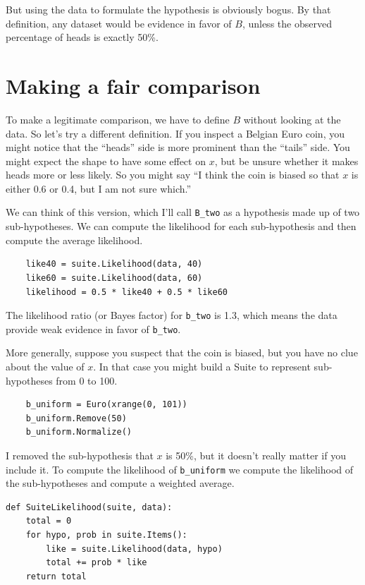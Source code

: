 \documentclass[12pt]{book}
\begin{document}
But using the data to formulate the hypothesis
is obviously bogus.  By that definition, any dataset would
be evidence in favor of $B$, unless the observed percentage of heads
is exactly 50\%.

\section{Making a fair comparison}

To make a legitimate comparison, we have to define $B$ without looking
at the data.  So let's try a different definition.  If you inspect
a Belgian Euro coin, you might notice that the ``heads'' side is more
prominent than the ``tails'' side.  You might expect the shape to 
have some effect on
$x$, but be unsure whether it makes heads more or less
likely.  So you might say ``I think the coin is biased so that
$x$ is either 0.6 or 0.4, but I am not sure which.''

We can think of this version, which I'll call \verb"B_two"
as a hypothesis made up of two
sub-hypotheses.  We can compute the likelihood for each
sub-hypothesis and then compute the average likelihood.

\begin{verbatim}
    like40 = suite.Likelihood(data, 40)
    like60 = suite.Likelihood(data, 60)
    likelihood = 0.5 * like40 + 0.5 * like60
\end{verbatim}

The likelihood ratio (or Bayes factor) for \verb"b_two" is 1.3, which
means the data provide weak evidence in favor of \verb"b_two".

More generally, suppose you suspect that the coin is biased,
but you have no clue about the value of $x$.  In that case you
might build a Suite to represent sub-hypotheses from 0 to 100.

\begin{verbatim}
    b_uniform = Euro(xrange(0, 101))
    b_uniform.Remove(50)
    b_uniform.Normalize()
\end{verbatim}

I removed the sub-hypothesis that $x$ is 50\%, but it doesn't
really matter if you include it.  To compute the likelihood of
\verb"b_uniform" we compute the likelihood of the sub-hypotheses
and compute a weighted average.

\begin{verbatim}
def SuiteLikelihood(suite, data):
    total = 0
    for hypo, prob in suite.Items():
        like = suite.Likelihood(data, hypo)
        total += prob * like
    return total
\end{verbatim}
\end{document}

